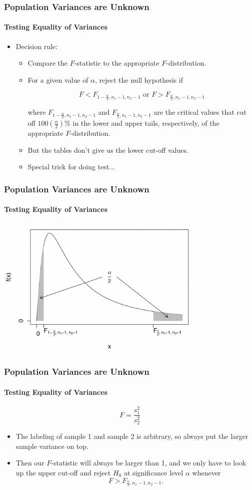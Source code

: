 \documentclass[12pt]{beamer}
\begin{document}
	\begin{frame}
		\frametitle{Population Variances are Unknown}
		\framesubtitle{Testing Equality of Variances}
		
		\begin{itemize}[label={\color{blue}$\blacktriangleright$}]
			\item Decision rule:
			\begin{itemize}[label={\color{blue}$\blacktriangleright$}]
				\item Compare the $F$-statistic to the appropriate $F$-distribution.
				\item For a given value of $\alpha$, reject the null hypothesis if
				
				\[F < F_{1-\frac{\alpha}{2},n_1-1,n_2-1} \text{ or } F > F_{\frac{\alpha}{2},n_1-1,n_2-1}\]
				
				where $F_{1-\frac{\alpha}{2},n_1-1,n_2-1}$ and $F_{\frac{\alpha}{2},n_1-1,n_2-1}$ are the critical values that cut off $100 \left(\frac{\alpha}{2}\right)\%$ in the lower and upper tails, respectively, of the appropriate $F$-distribution.
				\item But the tables don't give us the lower cut-off values.
				\item Special trick for doing test...
			\end{itemize}
		\end{itemize}
		
	\end{frame}
		\begin{frame}
		\frametitle{Population Variances are Unknown}
		\framesubtitle{Testing Equality of Variances}
\centering
\includegraphics[width=10cm]{eqvar.png}	
	\end{frame}
	\begin{frame}
		\frametitle{Population Variances are Unknown}
		\framesubtitle{Testing Equality of Variances}
		
		
		\[
		F = \frac{s_1^2}{s_2^2}
		\]
		
		
		\begin{itemize}[label={\color{blue}$\blacktriangleright$}]
			\item The labeling of sample 1 and sample 2 is arbitrary, so always put the larger sample variance on top.
			\item Then our $F$-statistic will always be larger than 1, and we only have to look up the upper cut-off and reject $H_0$ at significance level $\alpha$ whenever 
			\[F > F_{\frac{\alpha}{2},n_1-1,n_2-1}.\]
		\end{itemize}
		
	\end{frame}
\end{document}
